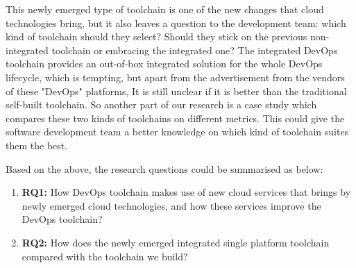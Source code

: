 \par
This newly emerged type of toolchain is one of the new changes that cloud technologies bring, but it also leaves a question to the development team: which kind of toolchain should they select? Should they stick on the previous non-integrated toolchain or embracing the integrated one? The integrated DevOps toolchain provides an out-of-box integrated solution for the whole DevOps lifecycle, which is tempting, but apart from the advertisement from the vendors of these "DevOps" platforms, It is still unclear if it is better than the traditional self-built toolchain. So another part of our research is a case study which compares these two kinds of toolchains on different metrics. This could give the software development team a better knowledge on which kind of toolchain suites them the best.
\par
Based on the above, the research questions could be summarised as below:
\begin{enumerate}
    \item \textbf{RQ1:} How DevOps toolchain makes use of new cloud services that brings by newly emerged cloud technologies, and how these services improve the DevOps toolchain?
    \item \textbf{RQ2:} How does the newly emerged integrated single platform toolchain compared with the toolchain we build?
\end{enumerate}
